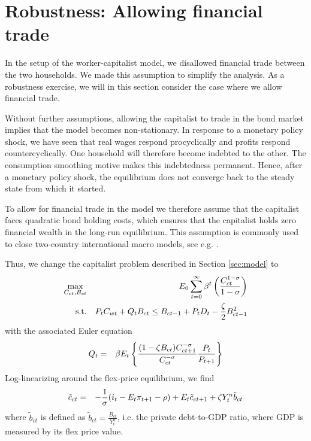 \section{Robustness: Allowing financial trade}
\label{sec:bond_trade}
In the setup of the worker-capitalist model, we disallowed financial trade between the two households. We made this assumption to simplify the analysis. As a robustness exercise, we will in this section consider the case where we allow financial trade. 

Without further assumptions, allowing the capitalist to trade in the bond market implies that the model becomes non-stationary. In response to a monetary policy shock, we have seen that real wages respond procyclically and profits respond countercyclically. One household will therefore become indebted to the other. The consumption smoothing motive makes this indebtedness permanent. Hence, after a monetary policy shock, the equilibrium does not converge back to the steady state from which it started.

To allow for financial trade in the model we therefore assume that the capitalist faces quadratic bond holding costs, which ensures that the capitalist holds zero financial wealth in the long-run equilibrium. This assumption is commonly used to close two-country international macro models, see e.g. \citep{Schmitt-Grohe2003}.

Thus, we change the capitalist problem described in Section \ref{sec:model} to 
\begin{eqnarray}
\max_{C_{ct}, B_{ct}} && E_0 \sum_{t=0}^{\infty} \beta^t \left( \frac{C_{ct}^{1-\sigma}}{1-\sigma}\right) \nonumber \\
\lb{worker_bc}
\text{s.t.} && P_t C_{wt} + Q_t B_{ct} \leq B_{ct-1}+P_t D_t-\frac{\zeta}{2}B_{ct-1}^2 \nonumber
\end{eqnarray}
with the associated Euler equation
\begin{eqnarray}
\lb{bt_euler}
Q_{t} &=& \beta E_t \left\{\frac{(1-\zeta B_{ct}) C^{-\sigma }_{ct+1}}{C^{-\sigma }_{ct}} \nonumber \frac{P_t}{P_{t+1}}\right\} \nonumber
\end{eqnarray}
Log-linearizing around the flex-price equilibrium, we find 
\begin{eqnarray}
\lb{bt_euler_log}
\tilde c_{ct} &=& -\frac{1}{\sigma}(i_t-E_t \pi_{t+1}-\rho) + E_t \tilde c_{ct+1} +\zeta Y^n_t \tilde b_{ct}
\end{eqnarray}
where $\tilde b_{ct}$ is defined as $\tilde b_{ct} = \frac{B_{ct}}{Y^{n}_t}$, i.e. the private debt-to-GDP ratio, where GDP is measured by its flex price value.

